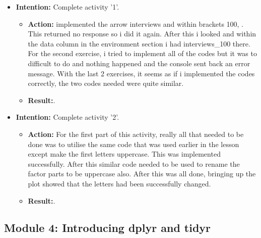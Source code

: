 \documentclass{article}
\begin{document}
\begin{itemize}
 
\item{\textbf{Intention:} Complete activity '1'.}

\begin{itemize}
\item{\textbf{Action:} implemented the arrow interviews and within brackets 100, . This returned no response so i did it again. After this i looked and within the data column in the environment section i had interviews_100 there. For the second exercise, i tried to implement all of the codes but it was to difficult to do and nothing happened and the console sent back an error message. With the last 2 exercises, it seems as if i implemented the codes correctly, the two codes needed were quite similar.}
\item{\textbf{Result:}.}
\end{itemize}


\item{\textbf{Intention:} Complete activity '2'.}

\begin{itemize}
\item{\textbf{Action:} For the first part of this activity, really all that needed to be done was to utilise the same code that was used earlier in the lesson except make the first letters uppercase. This was implemented successfully. After this similar code needed to be used to rename the factor parts to be uppercase also. After this was all done, bringing up the plot showed that the letters had been successfully changed.}
\item{\textbf{Result:}.}
\end{itemize}


\end{itemize}




\subsection{Module 4: Introducing dplyr and tidyr}
\end{document}
